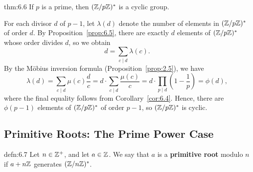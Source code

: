 \begin{theo}{thm:6.6}
    If $p$ is a prime, then $(\mathbb{Z}/p\mathbb{Z})^*$ is a cyclic group. 
\end{theo}
\begin{pf}
    For each divisor $d$ of $p-1$, let $\lambda(d)$ denote the number of elements 
    in $(\mathbb{Z}/p\mathbb{Z})^*$ of order $d$. By Proposition~\ref{prop:6.5}, there are 
    exactly $d$ elements of $(\mathbb{Z}/p\mathbb{Z})^*$ whose order divides $d$, so we obtain 
    \[ d = \sum_{c\mid d} \lambda(c). \] 
    By the M\"obius inversion formula (Proposition~\ref{prop:2.5}), we have 
    \[ \lambda(d) = \sum_{c\mid d} \mu(c) \frac{d}{c} = d \cdot \sum_{c \mid d}
    \frac{\mu(c)}{c} = d \cdot \prod_{p\mid d} \left( 1 - \frac{1}{p} \right) 
    = \phi(d), \] 
    where the final equality follows from Corollary~\ref{cor:6.4}. Hence, there 
    are $\phi(p-1)$ elements of $(\mathbb{Z}/p\mathbb{Z})^*$ of order $p-1$, so 
    $(\mathbb{Z}/p\mathbb{Z})^*$ is cyclic. 
\end{pf}

\subsection{Primitive Roots: The Prime Power Case}

\vspace{2ex}
\begin{defn}{defn:6.7}
    Let $n \in \mathbb{Z}^+$, and let $a \in \mathbb{Z}$. We say that $a$ is a {\bf primitive 
    root} modulo $n$ if $a + n\mathbb{Z}$ generates $(\mathbb{Z}/n\mathbb{Z})^*$. 
\end{defn}

